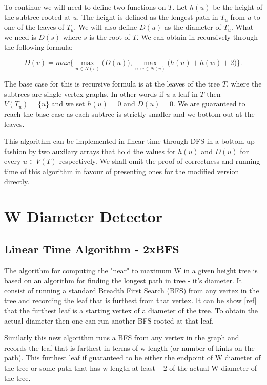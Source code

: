 To continue we will need to define two functions on $T$. Let $h(u)$ be the height of the subtree rooted at $u$. The height is defined as the longest path in $T_u$ from $u$ to one of the leaves of $T_u$. We will also define $D(u)$ as the diameter of $T_u$. What we need is $D(s)$ where $s$ is the root of $T$. We can obtain in recursively through the following formula:

$$ D(v) = max\bigg\{ \max\limits_{u \in N(v)}\bigg(D(u)\bigg), \max\limits_{u, w \in N(v)}\bigg(h(u) + h(w) + 2\bigg) \bigg\}. $$

The base case for this is recursive formula is at the leaves of the tree $T$, where the subtrees are single vertex graphs. In other words if $u$ a leaf in $T$ then $V(T_u) = \{u\}$ and we set $h(u) = 0$ and $D(u) = 0$. We are guaranteed to reach the base case as each subtree is strictly smaller and we bottom out at the leaves.

This algorithm can be implemented in linear time through DFS in a bottom up fashion by two auxilary arrays that hold the values for $h(u)$ and $D(u)$ for every $u \in V(T)$ respectively. We shall omit the proof of correctness and running time of this algorithm in favour of presenting ones for the modified version directly.


\section{W Diameter Detector}


\subsection{Linear Time Algorithm - 2xBFS}
The algorithm for computing the "near" to maximum W in a given height tree is based on an algorithm for finding the longest path in tree - it's diameter. It consist of running a standard Breadth First Search (BFS) from any vertex in the tree and recording the leaf that is furthest from that vertex. It can be show [ref] that the furthest leaf is a starting vertex of a diameter of the tree. To obtain the actual diameter then one can run another BFS rooted at that leaf.

Similarly this new algorithm runs a BFS from any vertex in the graph and records the leaf that is farthest in terms of w-length (or number of kinks on the path). This furthest leaf if guaranteed to be either the endpoint of W diameter of the tree or some path that has w-length at least $-2$ of the actual W diameter of the tree. 

